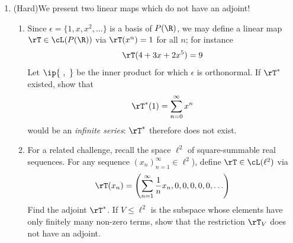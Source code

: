 \begin{exercises}
\begin{enumerate}
	
	
	\item\label{exs:adjnonexist} (Hard)\quad We present two linear maps which do not have an adjoint!
	\begin{enumerate}
	  \item Since $\epsilon=\{1,x,x^2,\ldots\}$ is a basis of $P(\R)$, we may define a linear map $\rT\in\cL(P(\R))$ via $\rT(x^n)=1$ for all $n$; for instance
		\[\rT(4+3x+2x^5)=9\]
		Let $\ip{\ ,\ }$ be the inner product for which $\epsilon$ is orthonormal. If $\rT^*$ existed, show that
		\[\rT^*(1)=\sum_{n=0}^\infty x^n\]
		would be an \emph{infinite series}: $\rT^*$ therefore does not exist.
		\item For a related challenge, recall the space $\ell^2$ of square-summable real sequences. For any sequence $(x_n)_{n=1}^\infty\in\ell^2$), define $\rT\in\cL(\ell^2)$ via
		\[\rT(x_n)=\left(\sum_{n=1}^\infty\frac 1nx_n,0,0,0,0,0,\ldots\right)\]
		Find the adjoint $\rT^*$. If $V\le\ell^2$ is the subspace whose elements have only finitely many non-zero terms, show that the restriction $\at\rT V$ does not have an adjoint.
	\end{enumerate}
\end{enumerate}
\end{exercises}


\iffalse

